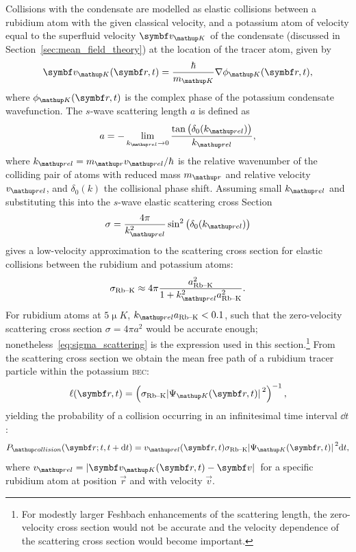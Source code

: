 Collisions with the condensate are modelled as elastic collisions between a rubidium atom with the given classical velocity, and a potassium atom of velocity equal to the superfluid velocity $\vec v_\up{K}$ of the condensate (discussed in Section~\ref{sec:mean_field_theory}) at the location of the tracer atom, given by
\begin{align}
\vec v_\up{K}(\vec r, t) = \frac \hbar {m_\up{K}} \nabla \phi_\up{K}(\vec r, t),
\end{align}
where $\phi_\up{K}(\vec r, t)$ is the complex phase of the potassium condensate wavefunction. The $s$-wave scattering length $a$ is defined as~\cite[p 589, eq.~12.101]{bransden_physics_2003}
\begin{align}
a = -\lim_{k_\up{rel}\rightarrow 0} \frac{\tan\left(\delta_0(k_\up{rel})\right)}{k_\up{rel}},
\end{align}
where $k_\up{rel}=m_\up{r}v_\up{rel}/\hbar$ is the relative wavenumber of the colliding pair of atoms with reduced mass $m_\up{r}$ and relative velocity $v_\up{rel}$, and $\delta_0(k)$ the collisional phase shift. Assuming small $k_\up{rel}$ and substituting this into the $s$-wave elastic scattering cross Section~\cite[p 584, eq.~12.66]{bransden_physics_2003} 
\begin{align}
\sigma = \frac{4\pi}{k_\up{rel}^2}\sin^2\left(\delta_0(k_\up{rel})\right)
\end{align}
gives a low-velocity approximation to the scattering cross section for elastic collisions between the rubidium and potassium atoms:
\begin{align}\label{eq:sigma_scattering}
\sigma_{\textrm{Rb--K}} \approx 4\pi\frac{a_{\textrm{Rb--K}}^2}{1 + k_\up{rel}^2a_{\textrm{Rb--K}}^2}.
\end{align}
For rubidium atoms at $5\unit{\upmu K}$, $k_\up{rel}a_{\textrm{Rb--K}} < 0.1$, such that the zero-velocity scattering cross section $\sigma = 4\pi a^2$ would be accurate enough; nonetheless~\eqref{eq:sigma_scattering} is the expression used in this section.\footnote{For modestly larger Feshbach enhancements of the scattering length, the zero-velocity cross section would not be accurate and the velocity dependence of the scattering cross section would become important.} From the scattering cross section we obtain the mean free path of a rubidium tracer particle within the potassium \textsc{bec}:
\begin{align}
\ell(\vec r, t) = \left(\sigma_{\textrm{Rb--K}}\abs{\Psi_\up{K}(\vec r, t)}^2\right)^{-1},
\end{align}
yielding the probability of a collision occurring in an infinitesimal time interval $\dd t$:
\begin{align}\label{eq:P_collision}
P_\up{collision}(\vec r; t, t+\dd t) = v_\up{rel}(\vec r, t)\sigma_{\textrm{Rb--K}}\abs{\Psi_\up{K}(\vec r, t)}^2\dd t,
\end{align}
where $v_\up{rel} = \abs{\vec v_\up{K}(\vec r, t) - \vec v}$ for a specific rubidium atom at position $\vec r$ and with velocity $\vec v$.

